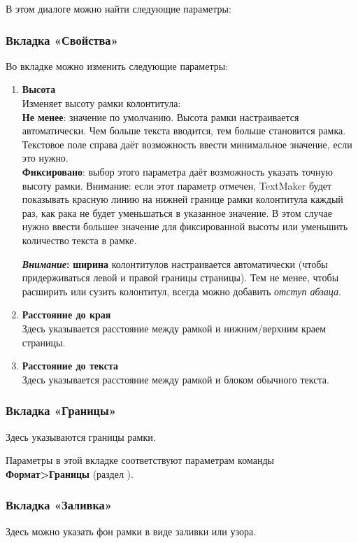 ﻿\documentclass[a4paper,10pt]{article}
\begin{document}
В этом диалоге можно найти следующие параметры:

\subsubsection{Вкладка «Свойства»}
Во вкладке можно изменить следующие  параметры:
\begin{enumerate}
 \item \textbf{Высота}\\
 Изменяет высоту рамки колонтитула:\\
 \textbf{Не менее}: значение по умолчанию. Высота рамки настраивается автоматически. Чем больше текста вводится, тем больше становится рамка. Текстовое поле справа даёт возможность ввести минимальное значение, если это нужно.\\
 \textbf{Фиксировано}: выбор этого параметра даёт возможность указать точную высоту рамки. Внимание: если этот параметр отмечен, TextMaker будет показывать красную линию на нижней границе рамки колонтитула каждый раз, как рака не будет уменьшаться в указанное значение. В этом случае нужно ввести большее значение для фиксированной высоты или уменьшить количество текста в рамке.
 \begin{mdframed}[backgroundcolor=blue!10]
\textbf{\textit{Внимание}:} \textbf{ширина} колонтитулов настраивается автоматически (чтобы придерживаться левой и правой границы страницы). Тем не менее, чтобы расширить или сузить колонтитул, всегда можно добавить \textit{отступ абзаца}. 
\end{mdframed}
\item \textbf{Расстояние до края}\\
Здесь указывается расстояние между рамкой и нижним/верхним краем страницы.
\item \textbf{Расстояние до текста}\\
Здесь указывается расстояние между рамкой и блоком обычного текста.
\end{enumerate}

\subsubsection{Вкладка «Границы»}
Здесь указываются границы рамки.

Параметры в этой вкладке соответствуют параметрам команды \textbf{Формат>Границы} (раздел ).

\subsubsection{Вкладка «Заливка»}
Здесь можно указать фон рамки в виде заливки или узора.
\end{document}
